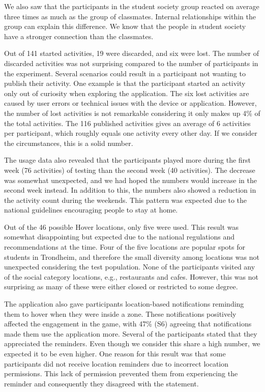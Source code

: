 We also saw that the participants in the student society group reacted on average three times as much as the group of classmates. Internal relationships within the group can explain this difference. We know that the people in student society have a stronger connection than the classmates. 

Out of 141 started activities, 19 were discarded, and six were lost. The number of discarded activities was not surprising compared to the number of participants in the experiment. Several scenarios could result in a participant not wanting to publish their activity. One example is that the participant started an activity only out of curiosity when exploring the application. The six lost activities are caused by user errors or technical issues with the device or application. However, the number of lost activities is not remarkable considering it only makes up 4\% of the total activities. The 116 published activities gives an average of 6 activities per participant, which roughly equals one activity every other day. If we consider the circumstances, this is a solid number.

The usage data also revealed that the participants played more during the first week (76 activities) of testing than the second week (40 activities). The decrease was somewhat unexpected, and we had hoped the numbers would increase in the second week instead. In addition to this, the numbers also showed a reduction in the activity count during the weekends. This pattern was expected due to the national guidelines encouraging people to stay at home.

Out of the 46 possible Hover locations, only five were used. This result was somewhat disappointing but expected due to the national regulations and recommendations at the time. Four of the five locations are popular spots for students in Trondheim, and therefore the small diversity among locations was not unexpected considering the test population. None of the participants visited any of the social category locations, e.g., restaurants and cafes. However, this was not surprising as many of these were either closed or restricted to some degree.

The application also gave participants location-based notifications reminding them to hover when they were inside a zone. These notifications positively affected the engagement in the game, with 47\% (S6) agreeing that notifications made them use the application more. Several of the participants stated that they appreciated the reminders. Even though we consider this share a high number, we expected it to be even higher. One reason for this result was that some participants did not receive location reminders due to incorrect location permissions. This lack of permission prevented them from experiencing the reminder and consequently they disagreed with the statement.

